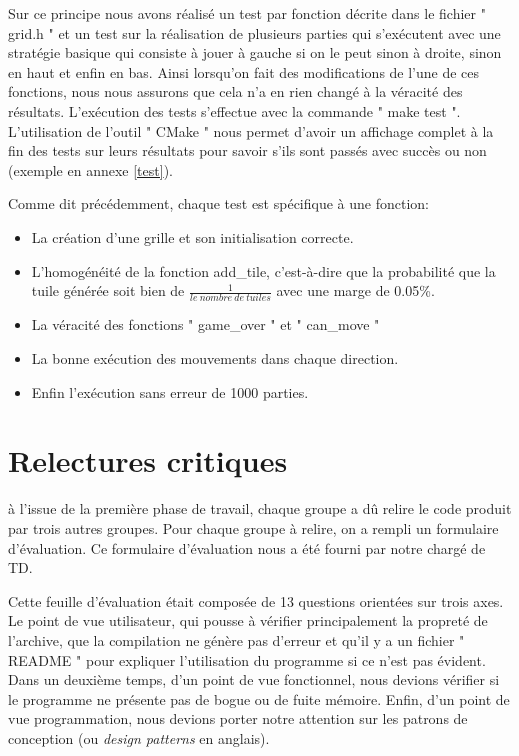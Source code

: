 \documentclass[12pt]{article}
\begin{document}
\par Sur ce principe nous avons réalisé un test par fonction décrite dans
le fichier " grid.h " et un test sur la réalisation de plusieurs parties
qui s'exécutent avec une stratégie basique qui consiste à jouer à gauche
si on le peut sinon à droite, sinon en haut et enfin en bas. Ainsi lorsqu'on fait
des modifications de l'une de ces fonctions, nous nous assurons que cela n'a en
rien changé à la véracité des résultats. L'exécution des tests
s'effectue avec la commande " make test ". L'utilisation de l'outil " CMake " nous permet
d'avoir un affichage complet à la fin des tests sur leurs résultats pour savoir s'ils sont passés avec succès
ou non (exemple en annexe \ref{test}).

\par Comme dit précédemment, chaque test est spécifique à une fonction:
\begin{itemize}
  \item La création d'une grille et son initialisation correcte.
  \item L'homogénéité de la fonction add\_tile, c'est-à-dire que la
  probabilité que la tuile générée soit bien de $
  \frac{1}{le\ nombre\ de\ tuiles} $ avec une marge de 0.05\%.
  \item La véracité des fonctions " game\_over " et " can\_move
  "
  \item La bonne exécution des mouvements dans chaque direction.
  \item Enfin l'exécution sans erreur de 1000 parties.
\end{itemize}

\newpage
\section{Relectures critiques}
à l’issue de la première phase de travail, chaque groupe a dû relire le code produit par trois autres groupes. Pour chaque groupe à relire, on a
rempli un formulaire d’évaluation. Ce formulaire d’évaluation nous a été
fourni par notre chargé de TD.

\par Cette feuille d'évaluation était composée de 13 questions orientées
sur trois axes. Le point de vue utilisateur, qui pousse à vérifier
principalement la propreté de l'archive, que la compilation ne génère pas
d'erreur et qu'il y a un fichier " README " pour expliquer l'utilisation
du programme si ce n'est pas évident. Dans un deuxième temps, d'un point de
vue fonctionnel, nous devions vérifier si le programme ne présente pas de
bogue ou de fuite mémoire. Enfin, d'un point de vue programmation, nous
devions porter notre attention sur les patrons de conception (ou \textit{design
patterns} en anglais).
\end{document}
